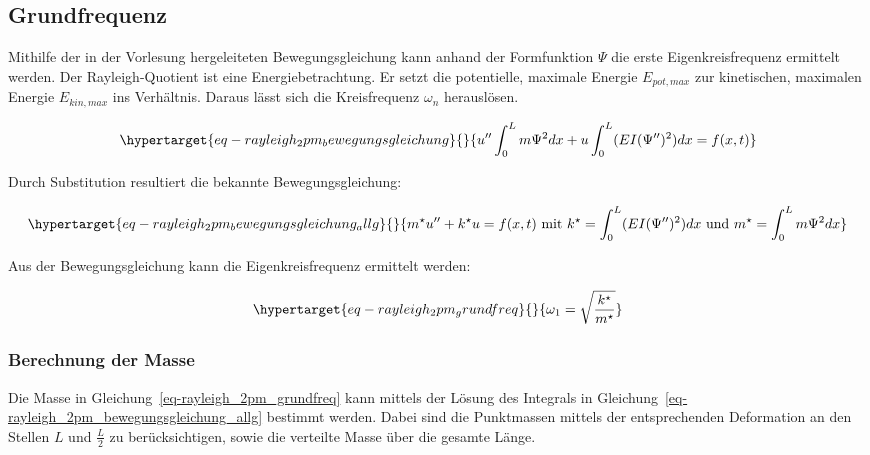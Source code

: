 \documentclass[
  letterpaper,
  DIV=11]{scrreprt}
\begin{document}
\hypertarget{grundfrequenz}{%
\subsection{Grundfrequenz}\label{grundfrequenz}}

Mithilfe der in der Vorlesung hergeleiteten Bewegungsgleichung kann
anhand der Formfunktion \(\Psi\) die erste Eigenkreisfrequenz ermittelt
werden. Der Rayleigh-Quotient ist eine Energiebetrachtung. Er setzt die
potentielle, maximale Energie \(E_{pot,max}\) zur kinetischen, maximalen
Energie \(E_{kin,max}\) ins Verhältnis. Daraus lässt sich die
Kreisfrequenz \(\omega_n\) herauslösen.

\begin{equation}\protect\hypertarget{eq-rayleigh_2pm_bewegungsgleichung}{}{
u'' \int_0^L m\Psi^2 dx + u \int_0^L (EI(\Psi'')^2)dx = f(x,t)
}\label{eq-rayleigh_2pm_bewegungsgleichung}\end{equation}

Durch Substitution resultiert die bekannte Bewegungsgleichung:

\begin{equation}\protect\hypertarget{eq-rayleigh_2pm_bewegungsgleichung_allg}{}{
m^\star u'' + k^\star u  = f(x,t) 
\text{ mit } k^\star = \int_0^L (EI(\Psi'')^2)dx 
\text{ und } m^\star = \int_0^L m\Psi^2dx
}\label{eq-rayleigh_2pm_bewegungsgleichung_allg}\end{equation}

Aus der Bewegungsgleichung kann die Eigenkreisfrequenz ermittelt werden:

\begin{equation}\protect\hypertarget{eq-rayleigh_2pm_grundfreq}{}{
\omega_1 = \sqrt{\frac{k^\star}{m^\star}}
}\label{eq-rayleigh_2pm_grundfreq}\end{equation}

\hypertarget{berechnung-der-masse}{%
\subsubsection{Berechnung der Masse}\label{berechnung-der-masse}}

Die Masse in Gleichung~\ref{eq-rayleigh_2pm_grundfreq} kann mittels der
Lösung des Integrals in
Gleichung~\ref{eq-rayleigh_2pm_bewegungsgleichung_allg} bestimmt werden.
Dabei sind die Punktmassen mittels der entsprechenden Deformation an den
Stellen \(L\) und \(\frac{L}{2}\) zu berücksichtigen, sowie die
verteilte Masse über die gesamte Länge.
\end{document}
